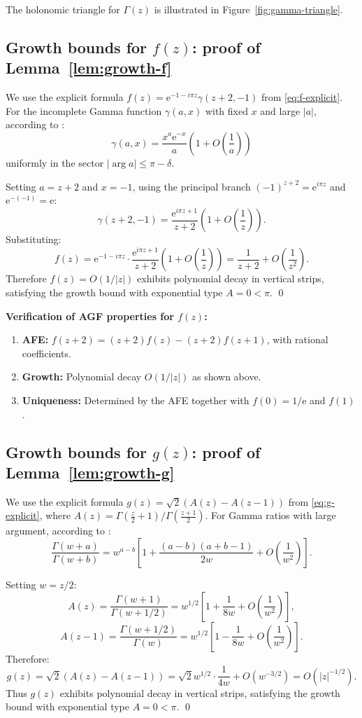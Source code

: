 \documentclass[11pt,reqno]{amsart}
\theoremstyle{definition}
\newcommand{\ee}{\mathrm{e}}
\numberwithin{equation}{section}
\begin{document}
The holonomic triangle for $\Gamma(z)$ is illustrated in Figure~\ref{fig:gamma-triangle}.

\subsection{Growth bounds for $f(z)$: proof of Lemma~\ref{lem:growth-f}}

We use the explicit formula $f(z) = \ee^{-1-i\pi z}\gamma(z+2,-1)$ from \eqref{eq:f-explicit}. For the incomplete Gamma function $\gamma(a,x)$ with fixed $x$ and large $|a|$, according to \cite[Eq.~8.11.6]{DLMF}:
\[
\gamma(a,x) = \frac{x^a \ee^{-x}}{a} \left(1 + O\left(\frac{1}{a}\right)\right)
\]
uniformly in the sector $|\arg a| \le \pi-\delta$.

Setting $a=z+2$ and $x=-1$, using the principal branch $(-1)^{z+2} = \ee^{i\pi z}$ and $\ee^{-(-1)} = \ee$:
\[
\gamma(z+2,-1) = \frac{\ee^{i\pi z+1}}{z+2} \left(1 + O\left(\frac{1}{z}\right)\right).
\]
Substituting:
\[
f(z) = \ee^{-1-i\pi z} \cdot \frac{\ee^{i\pi z+1}}{z+2} \left(1 + O\left(\frac{1}{z}\right)\right) = \frac{1}{z+2} + O\left(\frac{1}{z^2}\right).
\]
Therefore $f(z) = O(1/|z|)$ exhibits polynomial decay in vertical strips, satisfying the growth bound with exponential type $A=0 < \pi$. \qed

\textbf{Verification of AGF properties for $f(z)$:}
\begin{enumerate}[label=(\roman*)]
\item \textbf{AFE:} $f(z+2) = (z+2)f(z) - (z+2)f(z+1)$, with rational coefficients.
\item \textbf{Growth:} Polynomial decay $O(1/|z|)$ as shown above.
\item \textbf{Uniqueness:} Determined by the AFE together with $f(0) = 1/\ee$ and $f(1)$.
\end{enumerate}

\subsection{Growth bounds for $g(z)$: proof of Lemma~\ref{lem:growth-g}}

We use the explicit formula $g(z) = \sqrt{2}(A(z) - A(z-1))$ from \eqref{eq:g-explicit}, where $A(z) = \Gamma(\frac{z}{2}+1)/\Gamma(\frac{z+1}{2})$. For Gamma ratios with large argument, according to \cite[Eq.~5.11.12]{DLMF}:
\[
\frac{\Gamma(w+a)}{\Gamma(w+b)} = w^{a-b} \left[ 1 + \frac{(a-b)(a+b-1)}{2w} + O\left(\frac{1}{w^2}\right) \right].
\]

Setting $w=z/2$:
\[
A(z) = \frac{\Gamma(w+1)}{\Gamma(w+1/2)} = w^{1/2} \left[ 1 + \frac{1}{8w} + O\left(\frac{1}{w^2}\right) \right],
\]
\[
A(z-1) = \frac{\Gamma(w+1/2)}{\Gamma(w)} = w^{1/2} \left[ 1 - \frac{1}{8w} + O\left(\frac{1}{w^2}\right) \right].
\]
Therefore:
\[
g(z) = \sqrt{2}(A(z)-A(z-1)) = \sqrt{2} w^{1/2} \cdot \frac{1}{4w} + O(w^{-3/2}) = O(|z|^{-1/2}).
\]
Thus $g(z)$ exhibits polynomial decay in vertical strips, satisfying the growth bound with exponential type $A=0 < \pi$. \qed
\end{document}
